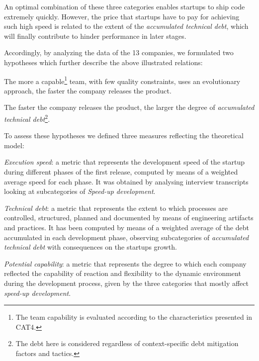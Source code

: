 \documentclass[10pt,journal,letterpaper,compsoc]{IEEEtran}
\begin{document}
An optimal combination of these three categories enables startups to ship code
extremely quickly. However, the price that startups have to pay for achieving
such high speed is related to the extent of the \textit{accumulated technical
debt}, which will finally contribute to hinder performance in later stages.


Accordingly, by analyzing the data of the 13 companies, we formulated two
hypotheses which further describe the above illustrated relations: 

\begin{compactenum} 
\item The more a capable\footnote{The team capability is
evaluated according to the characteristics presented in CAT4.} team, with few
quality constraints, uses an evolutionary approach, the faster the company
releases the product. 
\item The faster the company releases the product, the larger the degree of 
\textit{accumulated technical debt}\footnote{The debt here is considered 
regardless of context-specific debt mitigation factors and tactics.}. 
\end{compactenum}

To assess these hypotheses we defined three measures reflecting the theoretical
model:

\begin{compactitem}
\item \textit{Execution speed}: a metric that represents the development speed
of the startup during different phases of the first release, computed by means
of a weighted average speed for each phase. It was obtained by analysing
interview transcripts looking at subcategories of \textit{Speed-up development}.

\item \textit{Technical debt}: a metric that represents the extent to which
processes are controlled, structured, planned and documented by means of
engineering artifacts and practices. It has been computed by means of a weighted
average of the debt accumulated in each development phase, observing
subcategories of \textit{accumulated technical debt} with consequences on the
startups growth.

\item \textit{Potential capability}: a metric that represents the degree to
which each company reflected the capability of reaction and flexibility to the
dynamic environment during the development process, given by the three
categories that mostly affect \textit{speed-up development}. 
\end{compactitem}
\end{document}
